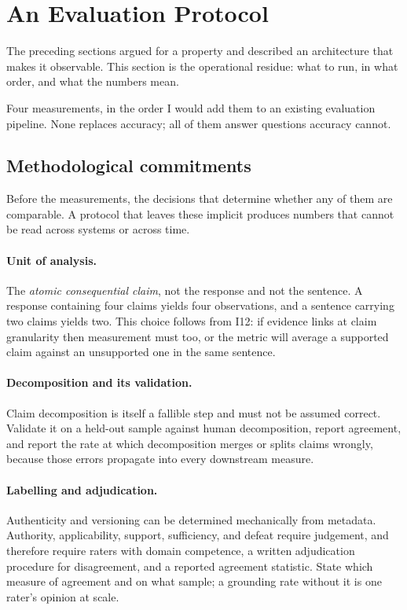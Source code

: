 \section{An Evaluation Protocol}
\label{sec:evaluation}

The preceding sections argued for a property and described an architecture that makes it
observable. This section is the operational residue: what to run, in what order, and what
the numbers mean.

Four measurements, in the order I would add them to an existing evaluation
pipeline. None replaces accuracy; all of them answer questions accuracy cannot.

\subsection{Methodological commitments}
\label{sec:method}

Before the measurements, the decisions that determine whether any of them are
comparable. A protocol that leaves these implicit produces numbers that cannot be read
across systems or across time.

\paragraph{Unit of analysis.} The \emph{atomic consequential claim}, not the response
and not the sentence. A response containing four claims yields four observations, and a
sentence carrying two claims yields two. This choice follows from I12: if evidence links
at claim granularity then measurement must too, or the metric will average a supported
claim against an unsupported one in the same sentence.

\paragraph{Decomposition and its validation.} Claim decomposition is itself a fallible
step and must not be assumed correct. Validate it on a held-out sample against human
decomposition, report agreement, and report the rate at which decomposition merges or
splits claims wrongly, because those errors propagate into every downstream measure.

\paragraph{Labelling and adjudication.} Authenticity and versioning can be determined
mechanically from metadata. Authority, applicability, support, sufficiency, and defeat
require judgement, and therefore require raters with domain competence, a written
adjudication procedure for disagreement, and a reported agreement statistic. State which
measure of agreement and on what sample; a grounding rate without it is one rater's
opinion at scale.

